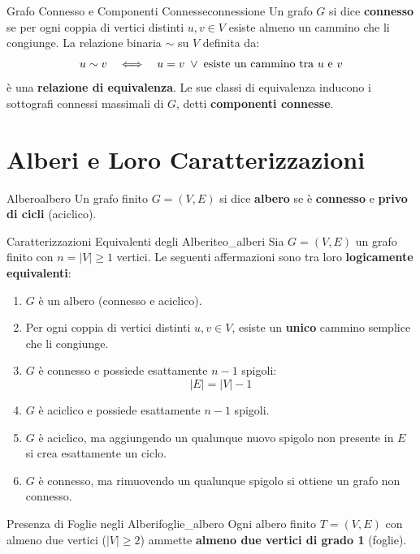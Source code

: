 \begin{definizione}{Grafo Connesso e Componenti Connesse}{connessione}
Un grafo $G$ si dice \textbf{connesso} se per ogni coppia di vertici distinti $u, v \in V$ esiste almeno un cammino che li congiunge.
La relazione binaria $\sim$ su $V$ definita da:
\[
    u \sim v \quad \Longleftrightarrow \quad u = v \;\vee\; \text{esiste un cammino tra } u \text{ e } v
\]
è una \textbf{relazione di equivalenza}. Le sue classi di equivalenza inducono i sottografi connessi massimali di $G$, detti \textbf{componenti connesse}.
\end{definizione}

\section{Alberi e Loro Caratterizzazioni}

\begin{definizione}{Albero}{albero}
Un grafo finito $G = (V, E)$ si dice \textbf{albero} se è \textbf{connesso} e \textbf{privo di cicli} (aciclico).
\end{definizione}

\begin{teorema}{Caratterizzazioni Equivalenti degli Alberi}{teo_alberi}
Sia $G = (V, E)$ un grafo finito con $n = |V| \ge 1$ vertici. Le seguenti affermazioni sono tra loro \textbf{logicamente equivalenti}:
\begin{enumerate}
    \item $G$ è un albero (connesso e aciclico).
    \item Per ogni coppia di vertici distinti $u, v \in V$, esiste un \textbf{unico} cammino semplice che li congiunge.
    \item $G$ è connesso e possiede esattamente $n - 1$ spigoli:
    \[
        |E| = |V| - 1
    \]
    \item $G$ è aciclico e possiede esattamente $n - 1$ spigoli.
    \item $G$ è aciclico, ma aggiungendo un qualunque nuovo spigolo non presente in $E$ si crea esattamente un ciclo.
    \item $G$ è connesso, ma rimuovendo un qualunque spigolo si ottiene un grafo non connesso.
\end{enumerate}
\end{teorema}

\begin{proposizione}{Presenza di Foglie negli Alberi}{foglie_albero}
Ogni albero finito $T = (V, E)$ con almeno due vertici ($|V| \ge 2$) ammette \textbf{almeno due vertici di grado 1} (foglie).
\end{proposizione}

